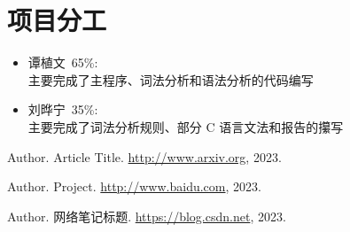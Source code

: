 \documentclass[cs4size,a4paper]{ctexart}
\begin{document}
\section{项目分工}
\begin{itemize}
    \item 谭植文\ 65\%:\\
        主要完成了主程序、词法分析和语法分析的代码编写
    \item 刘晔宁\ 35\%:\\
        主要完成了词法分析规则、部分 C 语言文法和报告的攥写
\end{itemize}
%
                         
\begin{thebibliography}{99}
Author. Article Title. \url{http://www.arxiv.org}, 2023.

Author. Project. \url{http://www.baidu.com}, 2023.

Author. 网络笔记标题. \url{https://blog.csdn.net}, 2023.
\end{thebibliography}
\end{document}

